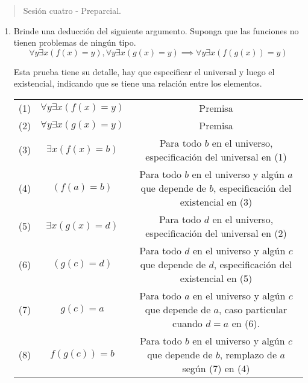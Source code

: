 



\maketitle

\begin{abstract}
Sesión cuatro - Preparcial.
\end{abstract}

\begin{enumerate}

    \item Brinde una deducción del siguiente argumento. Suponga que las funciones no tienen problemas de ningún tipo.
     $$\forall y \exists x (f(x) = y) , \forall y \exists x (g(x) = y) \implies \forall y \exists x (f(g(x)) = y ) $$

    \begin{solucion}

    Esta prueba tiene su detalle, hay que especificar el universal y luego el existencial, indicando que se tiene una relación entre los elementos.

    \begin{tabular}{c c c}
         (1) & $\forall y \exists x (f(x) = y)$ & Premisa \\
         (2) & $\forall y \exists x (g(x) = y)$ & Premisa \\

         (3) & $ \exists x (f(x) = b)$ & Para todo $b$ en el universo, especificación del universal en (1) \\
         (4) & $ (f(a) = b)$ & Para todo $b$ en el universo y algún $a$ que depende de $b$, especificación del existencial en (3) \\

         (5) & $ \exists x (g(x) = d)$ & Para todo $d$ en el universo, especificación del universal en (2) \\
         (6) & $ (g(c) = d)$ & Para todo $d$ en el universo y algún $c$ que depende de $d$, especificación del existencial en (5) \\

         (7) & $g(c) = a $ & Para todo $a$ en el universo y algún $c$ que depende de $a$, caso particular cuando $d= a$ en (6). \\
         (8) & $f(g(c)) = b$ & Para todo $b$ en el universo y algún $c$ que depende de $b$, remplazo de $a$ según (7) en (4) \\


\end{tabular}
\end{solucion}
\end{enumerate}
